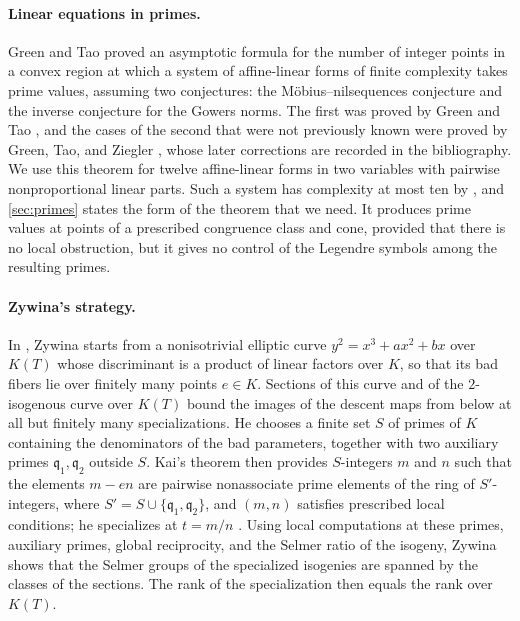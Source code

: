 \paragraph{Linear equations in primes.} Green and Tao \cite{GT2010} proved an asymptotic formula for the number of integer points in a convex region at which a system of affine-linear forms of finite complexity takes prime values, assuming two conjectures: the M\"obius--nilsequences conjecture and the inverse conjecture for the Gowers norms. The first was proved by Green and Tao \cite[Theorem~1.1]{GT2012}, and the cases of the second that were not previously known were proved by Green, Tao, and Ziegler \cite[Theorem~1.3]{GTZ2012}, whose later corrections are recorded in the bibliography. We use this theorem for twelve affine-linear forms in two variables with pairwise nonproportional linear parts. Such a system has complexity at most ten by \cite[Lemma~1.6]{GT2010}, and \cref{sec:primes} states the form of the theorem that we need. It produces prime values at points of a prescribed congruence class and cone, provided that there is no local obstruction, but it gives no control of the Legendre symbols among the resulting primes.

\paragraph{Zywina's strategy.} In \cite{Zywina2026}, Zywina starts from a nonisotrivial elliptic curve $y^2=x^3+ax^2+bx$ over $K(T)$ whose discriminant is a product of linear factors over $K$, so that its bad fibers lie over finitely many points $e\in K$. Sections of this curve and of the $2$-isogenous curve over $K(T)$ bound the images of the descent maps from below at all but finitely many specializations. He chooses a finite set $S$ of primes of $K$ containing the denominators of the bad parameters, together with two auxiliary primes $\mathfrak q_1,\mathfrak q_2$ outside $S$. Kai's theorem \cite[Proposition~13.2]{Kai} then provides $S$-integers $m$ and $n$ such that the elements $m-en$ are pairwise nonassociate prime elements of the ring of $S'$-integers, where $S'=S\cup\{\mathfrak q_1,\mathfrak q_2\}$, and $(m,n)$ satisfies prescribed local conditions; he specializes at $t=m/n$ \cite[Proposition~5.9]{Zywina2026}. Using local computations at these primes, auxiliary primes, global reciprocity, and the Selmer ratio of the isogeny, Zywina shows that the Selmer groups of the specialized isogenies are spanned by the classes of the sections. The rank of the specialization then equals the rank over $K(T)$.

